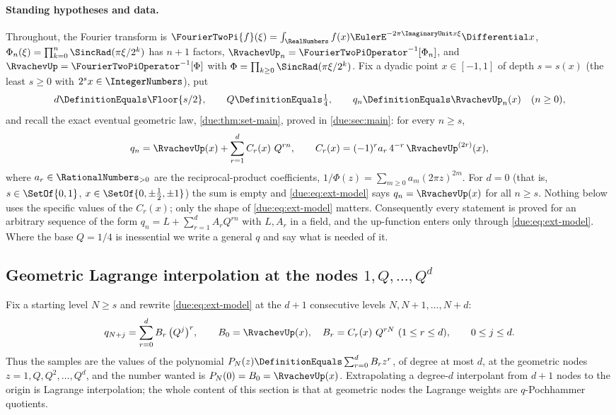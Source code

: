 \documentclass[11pt,oneside]{article}
\theoremstyle{plain}
\theoremstyle{definition}
\theoremstyle{remark}
\newcommand{\upn}[1]{\RvachevUp_{#1}}
\newcommand{\Phin}[1]{\Phi_{#1}}                            %
\newcommand{\PhiUp}{\Phi}                                   %
\newcommand{\dep}[1]{s\!\left(#1\right)}                    %
\newcommand{\Qq}{Q}                                         %
\newcommand{\am}[1]{a_{#1}}                                 %
\newcommand{\Cr}[2]{C_{#1}\!\left(#2\right)}                %
\newcommand{\qn}[1]{q_{#1}}                                 %
\begin{document}
\paragraph{Standing hypotheses and data.}
Throughout, the Fourier transform is $\FourierTwoPi{f}(\xi)
=\int_{\RealNumbers}f(x)\EulerE^{-2\pi\ImaginaryUnit x\xi}\Differential x$,
$\Phin{n}(\xi)=\prod_{k=0}^{n}\SincRad(\pi\xi/2^{k})$ has $n+1$ factors,
$\upn{n}=\FourierTwoPiOperator^{-1}[\Phin{n}]$, and
$\RvachevUp=\FourierTwoPiOperator^{-1}[\PhiUp]$ with
$\PhiUp=\prod_{k\ge0}\SincRad(\pi\xi/2^{k})$.  Fix a dyadic point
$x\in[-1,1]$ of depth $s=\dep{x}$ (the least $s\ge0$ with
$2^{s}x\in\IntegerNumbers$), put
\begin{equation}
 d\DefinitionEquals\Floor{s/2},\qquad
 \Qq\DefinitionEquals\tfrac14,\qquad
 \qn{n}\DefinitionEquals\upn{n}(x)\quad(n\ge0),
 \label{due:eq:ext-data}
\end{equation}
and recall the exact eventual geometric law, \cref{due:thm:set-main}, proved
in \cref{due:sec:main}: for every $n\ge s$,
\begin{equation}
 \qn{n}
 =\RvachevUp(x)+\sum_{r=1}^{d}\Cr{r}{x}\,\Qq^{rn},
 \qquad
 \Cr{r}{x}=(-1)^{r}\am{r}\,4^{-r}\,\RvachevUp^{(2r)}(x),
 \label{due:eq:ext-model}
\end{equation}
where $\am{r}\in\RationalNumbers_{>0}$ are the reciprocal-product
coefficients, $1/\PhiUp(z)=\sum_{m\ge0}\am{m}(2\pi z)^{2m}$.  For $d=0$ (that
is, $s\in\SetOf{0,1}$, $x\in\SetOf{0,\pm\tfrac12,\pm1}$) the sum is empty and
\cref{due:eq:ext-model} says $\qn{n}=\RvachevUp(x)$ for all $n\ge s$.
Nothing below uses the specific values of the $\Cr{r}{x}$; only the shape of
\cref{due:eq:ext-model} matters.  Consequently every statement is proved for an
arbitrary sequence of the form $\qn{n}=L+\sum_{r=1}^{d}A_{r}\Qq^{rn}$ with
$L,A_{r}$ in a field, and the up-function enters only through
\cref{due:eq:ext-model}.  Where the base $\Qq=1/4$ is inessential we write a
general $q$ and say what is needed of it.

\subsection{Geometric Lagrange interpolation at the nodes
\texorpdfstring{$1,\Qq,\ldots,\Qq^{d}$}{1, Q, ..., Q\^{}d}}

Fix a starting level $N\ge s$ and rewrite \cref{due:eq:ext-model} at the
$d+1$ consecutive levels $N,N+1,\ldots,N+d$:
\begin{equation}
 \qn{N+j}
 =\sum_{r=0}^{d}B_{r}\,\bigl(\Qq^{j}\bigr)^{r},
 \qquad
 B_{0}=\RvachevUp(x),\quad
 B_{r}=\Cr{r}{x}\,\Qq^{rN}\ (1\le r\le d),
 \qquad 0\le j\le d.
 \label{due:eq:ext-samples}
\end{equation}
Thus the samples are the values of the polynomial
$P_{N}(z)\DefinitionEquals\sum_{r=0}^{d}B_{r}z^{r}$, of degree at most $d$,
at the geometric nodes $z=1,\Qq,\Qq^{2},\ldots,\Qq^{d}$, and the number wanted
is $P_{N}(0)=B_{0}=\RvachevUp(x)$.  Extrapolating a degree-$d$ interpolant
from $d+1$ nodes to the origin is Lagrange interpolation; the whole content of
this section is that at geometric nodes the Lagrange weights are
$q$-Pochhammer quotients.
\end{document}
